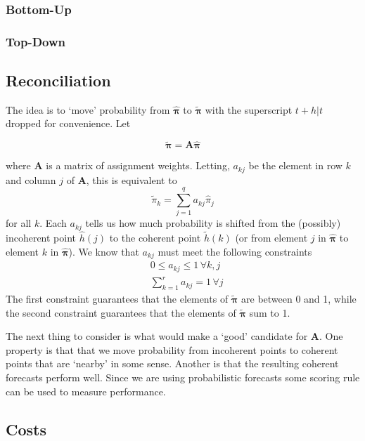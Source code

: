 \documentclass[a4paper,review,12pt,authoryear]{elsarticle}
\newcommand{\bpi}{\bm{\pi}}
\begin{document}
    \subsubsection*{Bottom-Up}

    \subsubsection*{Top-Down}
    \subsection{Reconciliation}
    
    The idea is to `move' probability from $\hat{\bpi}$ to $\tilde{\bpi}$ with the superscript $t+h|t$ dropped for convenience.  Let
    
    \[
    \tilde{\bpi}=\bm{A}\hat{\bpi}
    \] 
    
    where $\bm{A}$ is a matrix of assignment weights. Letting, $a_{kj}$ be the element in row $k$ and column $j$ of $\bm{A}$, this is equivalent to
    \[
      \tilde{\pi}_k=\sum\limits_{j=1}^q a_{kj}\hat{{\pi}}_j
    \]
    for all $k$. Each $a_{kj}$ tells us how much probability is shifted from the (possibly) incoherent point $\hat{h}(j)$ to the coherent point $\tilde{h}(k)$ (or from element $j$ in $\hat{\bpi}$ to element $k$ in $\hat{\bpi}$). We know that $a_{kj}$ must meet the following constraints
    \begin{align*}
    &0\leq a_{kj} \leq 1 \,\forall k, j\\ 
    &\sum\limits_{k=1}^r a_{kj} = 1 \,\forall j 
    \end{align*}
    The first constraint guarantees that the elements of $\tilde{\bpi}$ are between 0 and 1, while the second constraint guarantees that the elements of $\tilde{\bpi}$ sum to 1.
    
    The next thing to consider is what would make a `good' candidate for $\bm{A}$.  One property is that that we move probability from incoherent points to coherent points that are  `nearby' in some sense. Another is that the resulting coherent forecasts perform well.  Since we are using probabilistic forecasts some scoring rule can be used to measure performance.
    
    \subsection{Costs}
    
\end{document}
